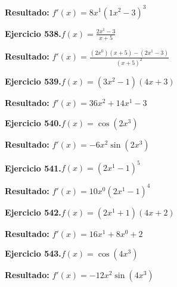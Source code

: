 \documentclass[10pt,a4paper]{article}
\begin{document}
\begin{solbox}
\textbf{Resultado:} \(\displaystyle f'(x) = 8x^{1}(1x^{2} -3)^{3}\)
\end{solbox}

\newpage
\begin{ejbox}
\textbf{Ejercicio 538.}\quad $f(x) = \frac{2x^{1} -3}{x + 5}$
\end{ejbox}

\begin{solbox}
\textbf{Resultado:} \(\displaystyle f'(x) = \frac{(2x^{0})(x+5) - (2x^{1} -3)}{(x+5)^2}\)
\end{solbox}

\begin{ejbox}
\textbf{Ejercicio 539.}\quad $f(x) = (3x^{2} -1)(4x +3)$
\end{ejbox}

\begin{solbox}
\textbf{Resultado:} \(\displaystyle f'(x) = 36x^{2} +14x^{1} -3\)
\end{solbox}

\begin{ejbox}
\textbf{Ejercicio 540.}\quad $f(x) = \cos(2x^{3})$
\end{ejbox}

\begin{solbox}
\textbf{Resultado:} \(\displaystyle f'(x) = -6x^{2}\sin(2x^{3})\)
\end{solbox}

\newpage
\begin{ejbox}
\textbf{Ejercicio 541.}\quad $f(x) = (2x^{1} -1)^{5}$
\end{ejbox}

\begin{solbox}
\textbf{Resultado:} \(\displaystyle f'(x) = 10x^{0}(2x^{1} -1)^{4}\)
\end{solbox}

\begin{ejbox}
\textbf{Ejercicio 542.}\quad $f(x) = (2x^{1} +1)(4x +2)$
\end{ejbox}

\begin{solbox}
\textbf{Resultado:} \(\displaystyle f'(x) = 16x^{1} +8x^{0} +2\)
\end{solbox}

\begin{ejbox}
\textbf{Ejercicio 543.}\quad $f(x) = \cos(4x^{3})$
\end{ejbox}

\begin{solbox}
\textbf{Resultado:} \(\displaystyle f'(x) = -12x^{2}\sin(4x^{3})\)
\end{solbox}
\end{document}
